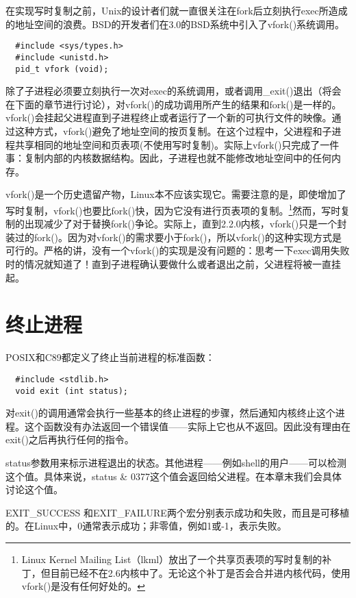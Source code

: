 在实现写时复制之前，Unix的设计者们就一直很关注在fork后立刻执行exec所造成的地址空间的浪费。BSD的开发者们在3.0的BSD系统中引入了vfork()系统调用。

\begin{lstlisting}
  #include <sys/types.h>
  #include <unistd.h>
  pid_t vfork (void);
\end{lstlisting}

除了子进程必须要立刻执行一次对exec的系统调用，或者调用\_exit()退出（将会在下面的章节进行讨论），对vfork()的成功调用所产生的结果和fork()是一样的。vfork()会挂起父进程直到子进程终止或者运行了一个新的可执行文件的映像。通过这种方式，vfork()避免了地址空间的按页复制。在这个过程中，父进程和子进程共享相同的地址空间和页表项(不使用写时复制)。实际上vfork()只完成了一件事：复制内部的内核数据结构。因此，子进程也就不能修改地址空间中的任何内存。

vfork()是一个历史遗留产物，Linux本不应该实现它。需要注意的是，即使增加了写时复制，vfork()也要比fork()快，因为它没有进行页表项的复制。\footnote[1]{Linux Kernel Mailing List（lkml）放出了一个共享页表项的写时复制的补丁，但目前已经不在2.6内核中了。无论这个补丁是否会合并进内核代码，使用vfork()是没有任何好处的。 }然而，写时复制的出现减少了对于替换fork()争论。实际上，直到2.2.0内核，vfork()只是一个封装过的fork()。因为对vfork()的需求要小于fork()，所以vfork()的这种实现方式是可行的。严格的讲，没有一个vfork()的实现是没有问题的：思考一下exec调用失败时的情况就知道了！直到子进程确认要做什么或者退出之前，父进程将被一直挂起。

\section{终止进程}

POSIX和C89都定义了终止当前进程的标准函数：

\begin{lstlisting}
  #include <stdlib.h>
  void exit (int status);
\end{lstlisting}

对exit()的调用通常会执行一些基本的终止进程的步骤，然后通知内核终止这个进程。这个函数没有办法返回一个错误值——实际上它也从不返回。因此没有理由在exit()之后再执行任何的指令。

status参数用来标示进程退出的状态。其他进程——例如shell的用户——可以检测这个值。具体来说，status \& 0377这个值会返回给父进程。在本章末我们会具体讨论这个值。

EXIT\_SUCCESS 和EXIT\_FAILURE两个宏分别表示成功和失败，而且是可移植的。在Linux中，0通常表示成功；非零值，例如1或-1，表示失败。

